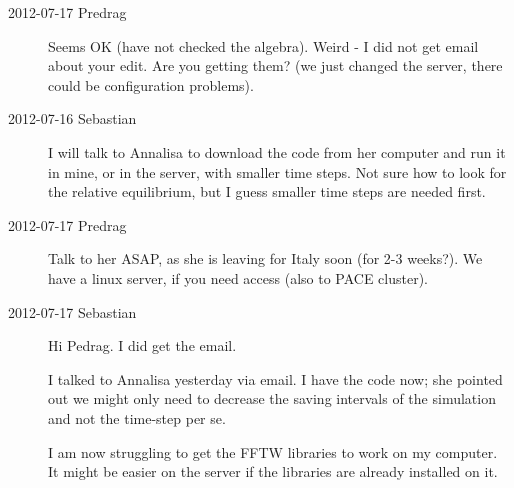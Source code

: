 \begin{description}
\item[2012-07-17 Predrag]
Seems OK (have not checked the algebra). Weird - I did not get email
about your edit. Are you getting them? (we just changed the server, there
could be configuration problems).

\item[2012-07-16 Sebastian]
I will talk to Annalisa to download the code from her computer and run it
in mine, or in the server, with smaller time steps. Not sure how to look
for the relative equilibrium, but I guess smaller time steps are needed
first.

\item[2012-07-17 Predrag]
Talk to her ASAP, as she is leaving for Italy soon (for 2-3 weeks?).
We have a linux server, if you need access (also to PACE cluster).

\item[2012-07-17 Sebastian]
Hi Pedrag. I did get the email. 

I talked to Annalisa yesterday via email. I have the code now; she pointed out we might only need to decrease the saving intervals of the simulation and not the time-step per se. 

I am now struggling to get the FFTW libraries to work on my computer. It might be easier on the server if the libraries are already installed on it.
\end{description}
